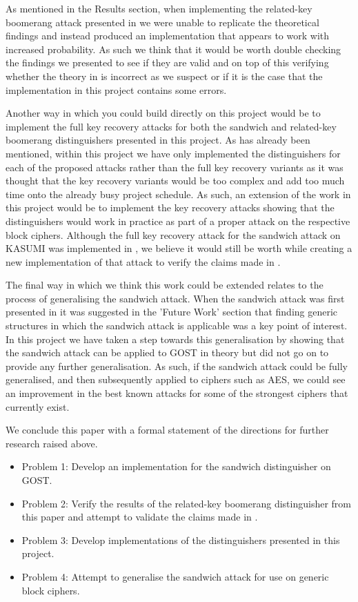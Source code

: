 \documentclass[10pt,journal,compsoc]{IEEEtran}
\begin{document}
As mentioned in the Results section, when implementing the related-key boomerang attack presented in \cite{cryptoeprint:2010/111} we were unable to replicate the theoretical findings and instead produced an implementation that appears to work with increased probability. As such we think that it would be worth double checking the findings we presented to see if they are valid and on top of this verifying whether the theory in \cite{cryptoeprint:2010/111} is incorrect as we suspect or if it is the case that the implementation in this project contains some errors.

Another way in which you could build directly on this project would be to implement the full key recovery attacks for both the sandwich and related-key boomerang distinguishers presented in this project. As has already been mentioned, within this project we have only implemented the distinguishers for each of the proposed attacks rather than the full key recovery variants as it was thought that the key recovery variants would be too complex and add too much time onto the already busy project schedule. As such, an extension of the work in this project would be to implement the key recovery attacks showing that the distinguishers would work in practice as part of a proper attack on the respective block ciphers. Although the full key recovery attack for the sandwich attack on KASUMI was implemented in \cite{jofc-2014-25962}, we believe it would still be worth while creating a new implementation of that attack to verify the claims made in \cite{jofc-2014-25962}.

The final way in which we think this work could be extended relates to the process of generalising the sandwich attack. When the sandwich attack was first presented in \cite{jofc-2014-25962} it was suggested in the 'Future Work' section that finding generic structures in which the sandwich attack is applicable was a key point of interest. In this project we have taken a step towards this generalisation by showing that the sandwich attack can be applied to GOST in theory but did not go on to provide any further generalisation. As such, if the sandwich attack could be fully generalised, and then subsequently applied to ciphers such as AES, we could see an improvement in the best known attacks for some of the strongest ciphers that currently exist.

We conclude this paper with a formal statement of the directions for further research raised above.

\begin{itemize}
    \item Problem 1: Develop an implementation for the sandwich distinguisher on GOST.
    \item Problem 2: Verify the results of the related-key boomerang distinguisher from this paper and attempt to validate the claims made in \cite{cryptoeprint:2010/111}.
    \item Problem 3: Develop implementations of the distinguishers presented in this project.
    \item Problem 4: Attempt to generalise the sandwich attack for use on generic block ciphers.
\end{itemize}
\end{document}
